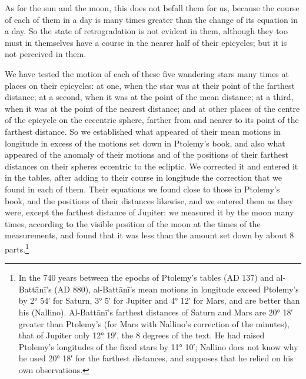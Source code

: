 \documentclass[11pt]{article}
\newcommand{\ArPage}[1]{\marginpar{\footnotesize\color{gray}Ar.\,p.\,#1}}
\begin{document}
\par As for the sun and the moon, this does not befall them for us, because the course of each of them in a day is many times greater than the change of its equation in a day. So the state of retrogradation is not evident in them, although they too must in themselves have a course in the nearer half of their epicycles; but it is not perceived in them.\par
\par \ArPage{99}We have tested the motion of each of these five wandering stars many times at places on their epicycles: at one, when the star was at their point of the farthest distance; at a second, when it was at the point of the mean distance; at a third, when it was at the point of the nearest distance; and at other places of the centre of the epicycle on the eccentric sphere, farther from and nearer to its point of the farthest distance. So we established what appeared of their mean motions in longitude in excess of the motions set down in Ptolemy's book, and also what appeared of the anomaly of their motions and of the positions of their farthest distances on their spheres eccentric to the ecliptic. We corrected it and entered it in the tables, after adding to their course in longitude the correction that we found in each of them. Their equations we found close to those in Ptolemy's book, and the positions of their distances likewise, and we entered them as they were, except the farthest distance of Jupiter: we measured it by the moon many times, according to the visible position of the moon at the times of the measurements, and found that it was less than the amount set down by about 8 parts.\footnote{In the 740 years between the epochs of Ptolemy's tables (AD 137) and al-Battānī's (AD 880), al-Battānī's mean motions in longitude exceed Ptolemy's by 2° 54′ for Saturn, 3° 5′ for Jupiter and 4° 12′ for Mars, and are better than his (Nallino). Al-Battānī's farthest distances of Saturn and Mars are 20° 18′ greater than Ptolemy's (for Mars with Nallino's correction of the minutes), that of Jupiter only 12° 19′, the 8 degrees of the text. He had raised Ptolemy's longitudes of the fixed stars by 11° 10′; Nallino does not know why he used 20° 18′ for the farthest distances, and supposes that he relied on his own observations.}\par
\end{document}
